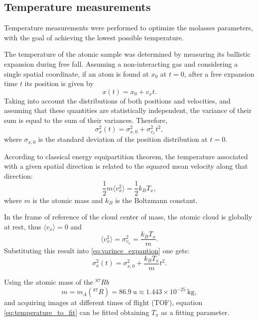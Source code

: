 \subsection{Temperature measurements}\label{subsec:temp_ext}
Temperature measurements were performed to optimize the molasses parameters, with the goal of achieving the lowest possible temperature. 

The temperature of the atomic sample was determined by measuring its ballistic expansion during free fall. Assuming a non-interacting gas and considering a single spatial coordinate, if an atom is found at $x_0$ at $t=0$, after a free expansion time $t$ its position is given by
\begin{equation}
    x(t)=x_0 + v_x t.
\end{equation}
Taking into account the distributions of both positions and velocities, and assuming that these quantities are statistically independent, the variance of their sum is equal to the sum of their variances. Therefore,
\begin{equation}
    \label{eq:varince_expantion}
    \sigma_x^2 (t)= \sigma_{x,0}^2 +\sigma_{v_x}^2t^2,
\end{equation}
where $\sigma_{x,0}$ is the standard deviation of the position distribution at $t=0$.

According to classical energy equipartition theorem, the temperature associated with a given spatial direction is related to the squared mean velocity along that direction:
\begin{equation}
    \frac{1}{2} m \langle v_x^2 \rangle = \frac{1}{2} k_B T_x,
\end{equation}
where $m$ is the atomic mass and $k_B$ is the Boltzmann constant.

In the frame of reference of the cloud center of mass, the atomic cloud is globally at rest, thus $\langle v_x \rangle =0$ and 
\begin{equation}
    \langle v_x^2 \rangle = \sigma_{v_x}^2 = \frac{k_B T_x}{m}.
\end{equation}
Substituting this result into \ref{eq:varince_expantion} one gets:
\begin{equation}
    \label{eq:temperature_to_fit}
    \sigma_x^2 (t)= \sigma_{x,0}^2 + \frac{k_B T_x}{m} t^2.
\end{equation}

Using the atomic mass of the $^{87}Rb$
\begin{equation}
    m = m_A({^{87}R}) = 86.9~\text{u} \approx 1.443 \times 10^{-25}~\text{kg},
\end{equation}
and acquiring images at different times of flight (TOF), equation \eqref{eq:temperature_to_fit} can be fitted obtaining $T_x$ as a fitting parameter.

